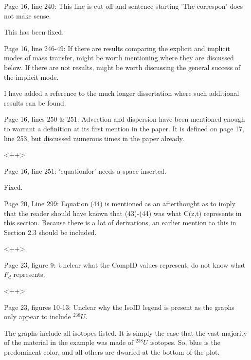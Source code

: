 \documentclass[answers,12pt]{exam}
\begin{document}
\begin{questions}
\question Page 16, line 240: This line is cut off and sentence starting 'The correspon' does not make sense. 
\begin{solution}
This has been fixed.
\end{solution} 
 
\question Page  16,  line  246-49:  If  there  are  results  comparing  the  explicit  and  implicit  modes  of  mass  transfer,  might  be  worth  mentioning  where  they  are  discussed  below.  If  there  are  not  results,  might  be  worth 
discussing the general success of the implicit mode. 
\begin{solution}
I have added a reference to the much longer dissertation where such additional 
results can be found.
\end{solution} 
 
\question Page  16,  lines  250 \& 251: Advection and dispersion have been mentioned enough to warrant a definition 
at  its  first  mention  in  the  paper.  It  is  defined  on  page  17,  line  253,  but  discussed numerous times in the 
paper already.  
\begin{solution}
<++>
\end{solution} 
 
\question Page 16, line 251: 'equationfor' needs a space inserted.  
\begin{solution}
Fixed.
\end{solution} 
 
\question Page  20,  Line  299:  Equation (44) is mentioned as an afterthought as to imply that the reader should have 
known  that  (43)-(44)  was  what  C(z,t)  represents  in  this  section.  Because  there  is  a  lot  of  derivations,  an 
earlier mention to this in Section 2.3 should be included.  
\begin{solution}
<++>
\end{solution} 
 
\question 
Page 23, figure 9: Unclear what the CompID values represent, do not know what $F_d$ represents. 
\begin{solution}
<++>
\end{solution} 
 
\question Page  23,  figures  10-13:  Unclear  why  the  IsoID  legend  is  
present  as  the  graphs  only  appear  to  include  $^{238} U$. 
\begin{solution}
The graphs include all isotopes listed. It is simply the case that the vast 
        majority of the material in the example was made of $^{238}U$ isotopes. 
        So, blue is the predominent color, and all others are dwarfed at the 
        bottom of the plot.
\end{solution} 
 

\end{questions}
\end{document}
